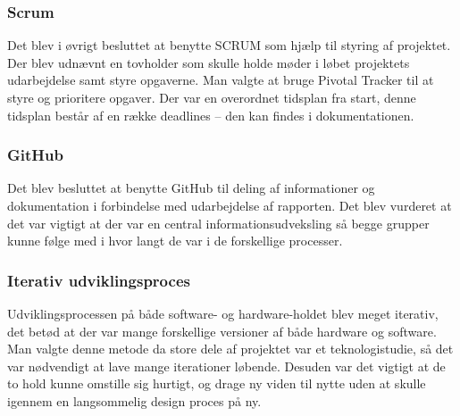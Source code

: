 \subsubsection{Scrum}
Det blev i øvrigt besluttet at benytte SCRUM som hjælp til styring af projektet. Der blev udnævnt en tovholder som skulle holde møder i løbet projektets udarbejdelse samt styre opgaverne. Man valgte at bruge Pivotal Tracker \cite{tracker}  til at styre og prioritere opgaver. Der var en overordnet tidsplan fra start, denne tidsplan består af en række deadlines – den kan findes i dokumentationen.
\subsubsection{GitHub}
Det blev besluttet at benytte GitHub til deling af informationer og dokumentation i forbindelse med udarbejdelse af rapporten. Det blev vurderet at det var vigtigt at der var en central informationsudveksling så begge grupper kunne følge med i hvor langt de var i de forskellige processer. 
\subsubsection{Iterativ udviklingsproces}
Udviklingsprocessen på både software- og hardware-holdet blev meget iterativ, det betød at der var mange forskellige versioner af både hardware og software. Man valgte denne metode da store dele af projektet var et teknologistudie, så det var nødvendigt at lave mange iterationer løbende. Desuden var det vigtigt at de to hold kunne omstille sig hurtigt, og drage ny viden til nytte uden at skulle igennem en langsommelig design proces på ny.
